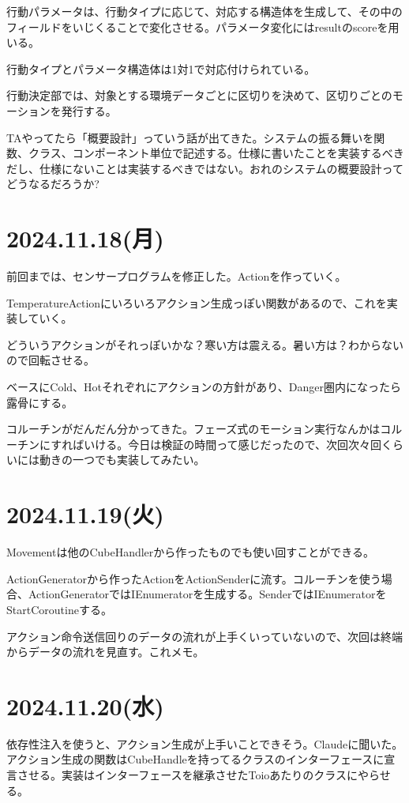 \documentclass[fleqn,twocolumn]{mynote}
\begin{document}
行動パラメータは、行動タイプに応じて、対応する構造体を生成して、その中のフィールドをいじくることで変化させる。パラメータ変化にはresultのscoreを用いる。

行動タイプとパラメータ構造体は1対1で対応付けられている。

行動決定部では、対象とする環境データごとに区切りを決めて、区切りごとのモーションを発行する。

TAやってたら「概要設計」っていう話が出てきた。システムの振る舞いを関数、クラス、コンポーネント単位で記述する。仕様に書いたことを実装するべきだし、仕様にないことは実装するべきではない。おれのシステムの概要設計ってどうなるだろうか?

\section*{2024.11.18(月)}
前回までは、センサープログラムを修正した。Actionを作っていく。

TemperatureActionにいろいろアクション生成っぽい関数があるので、これを実装していく。

どういうアクションがそれっぽいかな？寒い方は震える。暑い方は？わからないので回転させる。

ベースにCold、Hotそれぞれにアクションの方針があり、Danger圏内になったら露骨にする。

コルーチンがだんだん分かってきた。フェーズ式のモーション実行なんかはコルーチンにすればいける。今日は検証の時間って感じだったので、次回次々回くらいには動きの一つでも実装してみたい。

\section*{2024.11.19(火)}
Movementは他のCubeHandlerから作ったものでも使い回すことができる。

ActionGeneratorから作ったActionをActionSenderに流す。コルーチンを使う場合、ActionGeneratorではIEnumeratorを生成する。SenderではIEnumeratorをStartCoroutineする。

アクション命令送信回りのデータの流れが上手くいっていないので、次回は終端からデータの流れを見直す。これメモ。

\fboxsep=0pt            %
\fboxrule=1pt            %
\begin{figure}[h]
  \centering
  \caption{}
  \label{fig:}
\end{figure}

\section*{2024.11.20(水)}
依存性注入を使うと、アクション生成が上手いことできそう。Claudeに聞いた。アクション生成の関数はCubeHandleを持ってるクラスのインターフェースに宣言させる。実装はインターフェースを継承させたToioあたりのクラスにやらせる。
\end{document}

